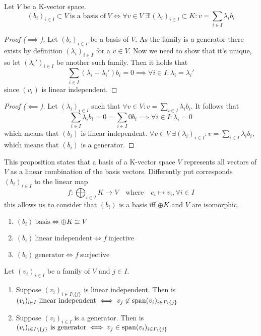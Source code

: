 \begin{proposition}
   Let \(V\) be a K-vector space.
   \[(b_i)_{i \in I} \subset V~\text{is a basis of}~V \iff \forall v \in V~\exists! (\lambda_i)_{i \in I} \subset K: v = \sum_{i \in I} \lambda_i b_i\]
\end{proposition}
\begin{proof}[Proof (\(\implies\))]
   Let \((b_i)_{i \in I}\) be a basis of \(V\).
   As the family is a generator there exists by definition \((\lambda_i)_{i \in I}\) for a \(v \in V\).
   Now we need to show that it's unique, so let \((\lambda_i')_{i \in I}\) be another such family.
   Then it holds that
   \[\sum_{i \in I} (\lambda_i - \lambda_i') b_i = 0 \implies \forall i \in I: \lambda_i = \lambda_i'\]
   since \((v_i)\) is linear independent.
\end{proof}
\begin{proof}[Proof (\(\impliedby\))]
   Let \((\lambda_i)_{i \in I}\) such that \(\forall v \in V: v = \sum_{i \in I} \lambda_i b_i\).
   It follows that
   \[\sum_{i \in I} \lambda_i b_i = 0 = \sum_{i \in I} 0 b_i \implies \forall i \in I: \lambda_i = 0\]
   which means that \((b_i)\) is linear independent.
   \(\forall v \in V~\exists (\lambda_i)_{i \in I}: v = \sum_{i \in I} \lambda_i b_i\), which means that \((b_i)\) is a generator.
\end{proof}
\begin{remark}
   This proposition states that a basis of a K-vector space \(V\) represents all vectors of \(V\) as a linear combination of the basis vectors.
   Differently put corresponds \((b_i)_{i \in I}\) to the linear map
   \[f: \bigoplus_{i \in I} K \to V \quad\text{where}\quad e_i \mapsto v_i, \forall i \in I\]
   this allows us to consider that \((b_i)\) is a basis iff \(\oplus K\) and \(V\) are isomorphic.
   \begin{enumerate}
      \item \((b_i)~\text{basis} \iff \oplus K \cong V\)
      \item \((b_i)~\text{linear independent} \iff f~\text{injective}\)
      \item \((b_i)~\text{generator} \iff f~\text{surjective}\)
   \end{enumerate}
\end{remark}

\begin{lemma}\label{lem:extending_family}
   Let \((v_i)_{i \in I}\) be a family of \(V\) and \(j \in I\).
   \begin{enumerate}[label=\roman*, align=Center]
      \item Suppose \((v_i)_{i \in I \setminus \{j\}}\) is linear independent. Then is \((v_i)_{i \in I}~\text{linear independent} \iff v_j \not\in \operatorname{span}(v_i)_{i \in I \setminus \{j\}}\)
      \item Suppose \((v_i)_{i \in I}\) is a generator. Then is \((v_i)_{i \in I \setminus \{j\}}~\text{is generator} \iff v_j \in \operatorname{span}(v_i)_{i \in I \setminus \{j\}}\)
   \end{enumerate}
\end{lemma}

